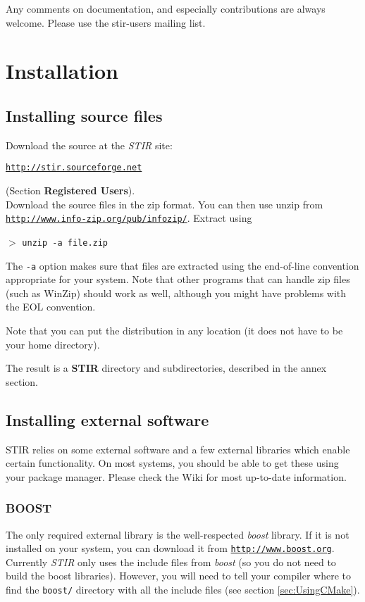 \documentclass{article}
\def\R2Lurl#1#2{\mbox{\href{#1}{\tt #2}}}
\newcommand{\cmdline}[1]{\par \noindent $>$ \texttt{#1}\par}
\begin{document}
Any comments on documentation, and especially contributions are 
always welcome. Please use the stir-users mailing list.

\section{
Installation}

\subsection{
Installing source files}

Download the source at the \textit{STIR} site: 
\begin{center}
\R2Lurl{http://stir.sourceforge.net }{http://stir.sourceforge.net} 
\end{center}
\noindent (Section \textbf{Registered Users}).\\
Download the source files in the zip format. You can then use unzip from \\
\R2Lurl{http://www.info-zip.org/pub/infozip/}{http://www.info-zip.org/pub/infozip/}. 
Extract using
\cmdline{unzip -a file.zip}


The \texttt{-a} option makes sure that files are extracted using the 
end-of-line convention appropriate for your system. Note that 
other programs that can handle zip files (such as WinZip) should 
work as well, although you might have problems with the EOL convention.


Note that you can put the distribution in any location (it does 
not have to be your home directory).


The result is a \textbf{STIR} directory and subdirectories, described 
in the annex section.

\subsection{
Installing external software}
STIR relies on some external software and a few external libraries which enable certain functionality. 
On most systems, you should be able to get these using your package manager. 
Please check the Wiki for most up-to-date information.

\subsubsection{BOOST}
The only required external library is the well-respected \textit{boost} library. If it
is not installed on your system, you can download it from 
\R2Lurl{http://www.boost.org}{http://www.boost.org}. Currently \textit{STIR} only
uses the include files from \textit{boost} (so you do not need to build
the boost libraries). However, you will need to tell your compiler
where to find the \texttt{boost/} directory with all the include files
(see section \ref{sec:UsingCMake}).
\end{document}
